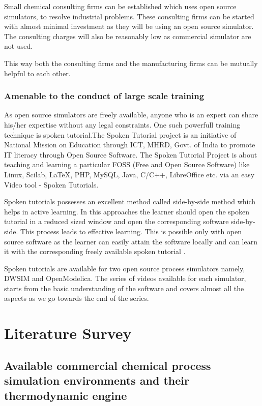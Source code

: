 \documentclass[12pt]{report}
\begin{document}
Small chemical consulting firms can be established which uses open source simulators, to resolve industrial problems. These consulting firms can be started with almost minimal investment as they will be using an open source simulator. The consulting charges will also be reasonably low as commercial simulator are not used.

This way both the consulting firms and the manufacturing firms can be mutually helpful to each other.

\subsection{Amenable to the conduct of large scale training}
As open source simulators are freely available, anyone who is an expert can share his/her expertise without any legal constraints. One such powerfull training technique is spoken tutorial.The Spoken Tutorial project is an initiative of National Mission on Education through ICT, MHRD, Govt. of India to promote IT literacy through Open Source Software. The Spoken Tutorial Project is about teaching and learning a particular FOSS (Free and Open Source Software) like Linux, Scilab, LaTeX, PHP, MySQL, Java, C/C++, LibreOffice etc. via an easy Video tool - Spoken Tutorials. 

Spoken tutorials possesses an excellent method called side-by-side method which helps in active learning. In this approaches the learner should open the spoken tutorial in a reduced sized window and open the corresponding software side-by-side. This process leads to effective learning. This is possible only with open source software as the learner can easily attain the software locally and can learn it with the corresponding freely available spoken tutorial \cite{Sidebyside}.

Spoken tutorials are available for two open source process simulators namely, DWSIM\cite{ST1} and OpenModelica\cite{ST2}. The series of videos available for each simulator, starts from the basic understanding of the software and covers almost all the aspects as we go towards the end of the series.  

\chapter{Literature Survey}
\section{Available commercial chemical process simulation environments and their thermodynamic engine}
\end{document}
